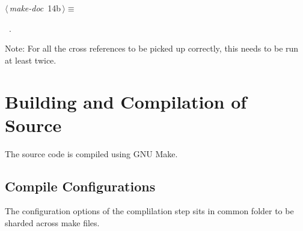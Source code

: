 \documentclass[a4paper,11pt]{article}
\begin{document}
\begin{flushleft} \small
\begin{minipage}{\linewidth}\label{scrap20}\raggedright\small
{} $\langle\,${\itshape make-doc}\nobreak\ {\footnotesize {14b}}$\,\rangle\equiv$
\vspace{-1ex}
\vspace{-1.5ex}
\footnotesize
\begin{list}{}{\setlength{\itemsep}{-\parsep}\setlength{\itemindent}{-\leftmargin}}
\item \NWtxtMacroRefIn\ .

\item{}
\end{list}
\end{minipage}\vspace{4ex}
\end{flushleft}
Note: For all the cross references to be picked up correctly, this needs to be run at
least twice.

\section{Building and Compilation of Source}
The source code is compiled using GNU Make.

\subsection{Compile Configurations}
The configuration options of the complilation step sits in common folder to be
sharded across make files.
\end{document}
